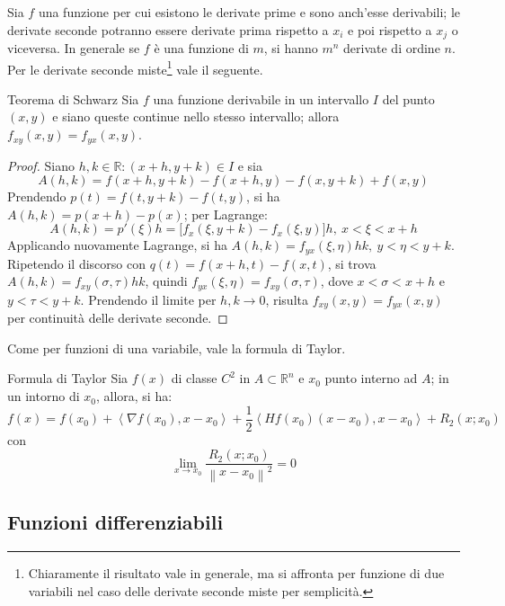 \documentclass[11pt, a4paper]{scrartcl}
\theoremstyle{definition}
\numberwithin{esempio}{section}
\theoremstyle{definition}
\numberwithin{obs}{section}
\numberwithin{nota}{section}
\numberwithin{equation}{subsection}
\begin{document}
Sia $f$ una funzione per cui esistono le derivate prime e sono anch'esse derivabili; le derivate seconde potranno essere derivate prima rispetto a $x_i$ e poi rispetto a $x_j$ o viceversa. In generale se $f$ \`e una funzione di $m$, si hanno $m^n$ derivate di ordine $n$. Per le derivate seconde miste\footnote{Chiaramente il risultato vale in generale, ma si affronta per funzione di due variabili nel caso delle derivate seconde miste per semplicit\`a.} vale il seguente.
\begin{teorema}
	{Teorema di Schwarz}{}
	Sia $f$ una funzione derivabile in un intervallo $I$ del punto $(x,y)$ e siano queste continue nello stesso intervallo; allora $f_{xy} (x,y) = f_{yx} (x,y)$.
	\begin{proof}
		Siano $h,k \in \mathbb{R}:(x+h,y+k) \in I$ e sia
		\[
		A(h,k) = f(x+h,y+k) - f(x+h,y) - f(x,y+k) + f(x,y)
		\] 
		Prendendo $p(t) = f(t,y+k) - f(t,y)$, si ha $A(h,k) = p(x+h) - p(x)$; per Lagrange:
		\[
			A(h,k) = p'(\xi ) h = \big[f_x(\xi ,y+k) - f_x(\xi ,y)\big]h ,\ x< \xi <x+h
		\] 
		Applicando nuovamente Lagrange, si ha $A(h,k) = f_{yx} (\xi, \eta) hk, \ y<\eta < y+k$. Ripetendo il discorso con $q(t) = f(x+h,t) - f(x,t)$, si trova $A(h,k) = f_{xy} (\sigma ,\tau ) hk$, quindi $f_{yx}(\xi ,\eta) =f_{xy} (\sigma ,\tau ) $, dove $x<\sigma <x+h$ e $y<\tau <y+k$. Prendendo il limite per $h,k\to 0$, risulta $f_{xy} (x,y) = f_{yx} (x,y)$ per continuit\`a delle derivate seconde.
		
	\end{proof}
\end{teorema}
\noindent Come per funzioni di una variabile, vale la formula di Taylor.
\begin{teorema}
	{Formula di Taylor}{}
	Sia $f(x)$ di classe $C^2$ in $A \subset \mathbb{R}^n$ e $x_0$ punto interno ad $A$; in un intorno di $x_0$, allora, si ha:
	\begin{equation}
		f(x) = f(x_0) + \left\langle \nabla f(x_0), x-x_0 \right\rangle + \frac{1}{2} \left\langle Hf(x_0) (x-x_0), x-x_0 \right\rangle + R_2(x;x_0)
	\end{equation}
	con 
	\[
	\lim_{x \to x_0} \frac{R_2(x;x_0)}{\left\lVert x-x_0 \right\rVert ^2} = 0
	\] 
	
\end{teorema}

\subsection{Funzioni differenziabili}
\end{document}
